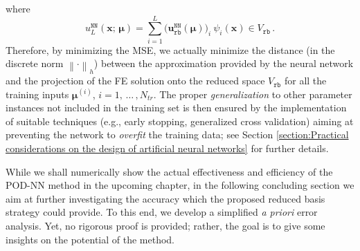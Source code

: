 \documentclass[12pt, a4paper, twoside, openright, notitlepage]{report}
\numberwithin{equation}{chapter}
\theoremstyle{theorem}
\theoremstyle{definition}
\theoremstyle{remark}
\theoremstyle{proposition}
\numberwithin{figure}{chapter}
\newcommand{\norm}[1]{\left\lVert#1\right\rVert}
\newcommand{\bg}[1]{\boldsymbol{#1}}
\begin{document}
		where
		\begin{equation}
			\label{eq:pod-nn-solution}
			u_L^{\texttt{NN}}(\bg{x}; \, \bg{\mu}) = \sum_{i = 1}^L \big( \mathbf{u}_{\texttt{rb}}^{\texttt{NN}}(\bg{\mu}) \big)_i ~ \psi_i(\bg{x}) \in V_{\texttt{rb}} \, .
		\end{equation}
		Therefore, by minimizing the MSE, we actually minimize the distance (in the discrete norm $\norm{\cdot}_h$) between the approximation provided by the neural network and the projection of the FE solution onto the reduced space $V_{\texttt{rb}}$ for all the training inputs $\bg{\mu}^{(i)}$, $i = 1, \, \ldots \, , N_{tr}$. The proper \emph{generalization} to other parameter instances not included in the training set is then ensured by the implementation of suitable techniques (e.g., early stopping, generalized cross validation) aiming at preventing the network to \emph{overfit} the training data; see Section \ref{section:Practical considerations on the design of artificial neural networks} for further details.
		
		While we shall numerically show the actual effectiveness and efficiency of the POD-NN method in the upcoming chapter, in the following concluding section we aim at further investigating the accuracy which the proposed reduced basis strategy could provide. To this end, we develop a simplified \emph{a priori} error analysis. Yet, no rigorous proof is provided; rather, the goal is to give some insights on the potential of the method.
								
\end{document}
